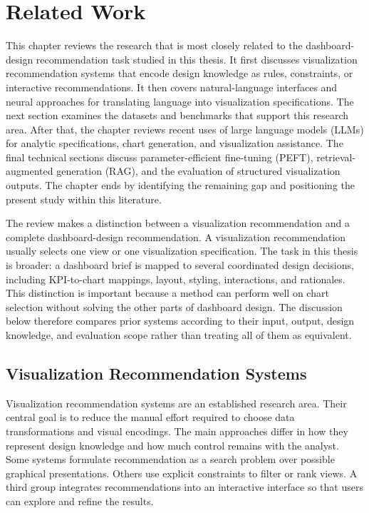 \chapter{Related Work}

This chapter reviews the research that is most closely related to the dashboard-design recommendation task studied in this thesis. It first discusses visualization recommendation systems that encode design knowledge as rules, constraints, or interactive recommendations. It then covers natural-language interfaces and neural approaches for translating language into visualization specifications. The next section examines the datasets and benchmarks that support this research area. After that, the chapter reviews recent uses of large language models (LLMs) for analytic specifications, chart generation, and visualization assistance. The final technical sections discuss parameter-efficient fine-tuning (PEFT), retrieval-augmented generation (RAG), and the evaluation of structured visualization outputs. The chapter ends by identifying the remaining gap and positioning the present study within this literature.

The review makes a distinction between a visualization recommendation and a complete dashboard-design recommendation. A visualization recommendation usually selects one view or one visualization specification. The task in this thesis is broader: a dashboard brief is mapped to several coordinated design decisions, including KPI-to-chart mappings, layout, styling, interactions, and rationales. This distinction is important because a method can perform well on chart selection without solving the other parts of dashboard design. The discussion below therefore compares prior systems according to their input, output, design knowledge, and evaluation scope rather than treating all of them as equivalent.

\section{Visualization Recommendation Systems}

Visualization recommendation systems are an established research area. Their central goal is to reduce the manual effort required to choose data transformations and visual encodings. The main approaches differ in how they represent design knowledge and how much control remains with the analyst. Some systems formulate recommendation as a search problem over possible graphical presentations. Others use explicit constraints to filter or rank views. A third group integrates recommendations into an interactive interface so that users can explore and refine the results.

